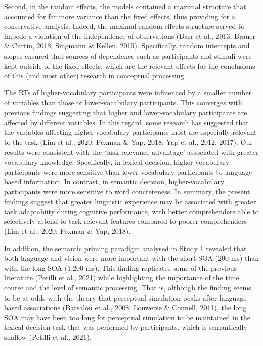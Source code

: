 \documentclass[
  12pt,
  man,floatsintext]{apa7}
\begin{document}
Second, in the random effects, the models contained a maximal structure that accounted for far more variance than the fixed effects, thus providing for a conservative analysis. Indeed, the maximal random-effects structure served to impede a violation of the independence of observations (Barr et al., 2013; Brauer \& Curtin, 2018; Singmann \& Kellen, 2019). Specifically, random intercepts and slopes ensured that sources of dependence such as participants and stimuli were kept outside of the fixed effects, which are the relevant effects for the conclusions of this (and most other) research in conceptual processing.

The RTs of higher-vocabulary participants were influenced by a smaller number of variables than those of lower-vocabulary participants. This converges with previous findings suggesting that higher and lower-vocabulary participants are affected by different variables. In this regard, some research has suggested that the variables affecting higher-vocabulary participants most are especially relevant to the task (Lim et al., 2020; Pexman \& Yap, 2018; Yap et al., 2012, 2017). Our results were consistent with the `task-relevance advantage' associated with greater vocabulary knowledge. Specifically, in lexical decision, higher-vocabulary participants were more sensitive than lower-vocabulary participants to language-based information. In contrast, in semantic decision, higher-vocabulary participants were more sensitive to word concreteness. In summary, the present findings suggest that greater linguistic experience may be associated with greater task adaptabiity during cognitive performance, with better comprehenders able to selectively attend to task-relevant features compared to poorer comprehenders (Lim et al., 2020; Pexman \& Yap, 2018).

In addition, the semantic priming paradigm analysed in Study 1 revealed that both language and vision were more important with the short SOA (200 ms) than with the long SOA (1,200 ms). This finding replicates some of the previous literature (Petilli et al., 2021) while highlighting the importance of the time course and the level of semantic processing. That is, although the finding seems to be at odds with the theory that perceptual simulation peaks after language-based associations (Barsalou et al., 2008; Louwerse \& Connell, 2011), the long SOA may have been too long for perceptual simulation to be maintained in the lexical decision task that was performed by participants, which is semantically shallow (Petilli et al., 2021).
\end{document}
